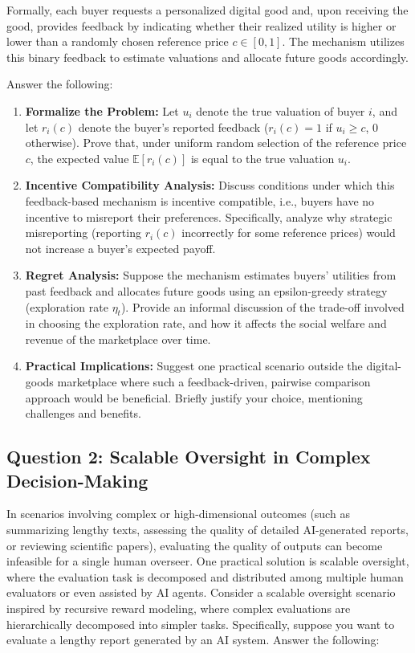 \documentclass[
  letterpaper,
  numbers=noenddot,
  DIV=11]{scrreprt}
\theoremstyle{plain}
\theoremstyle{definition}
\theoremstyle{remark}
\begin{document}
Formally, each buyer requests a personalized digital good and, upon
receiving the good, provides feedback by indicating whether their
realized utility is higher or lower than a randomly chosen reference
price \(c \in [0,1]\). The mechanism utilizes this binary feedback to
estimate valuations and allocate future goods accordingly.

Answer the following:

\begin{enumerate}
\def\labelenumi{(\alph{enumi})}
\item
  \textbf{Formalize the Problem:} Let \(u_i\) denote the true valuation
  of buyer \(i\), and let \(r_i(c)\) denote the buyer's reported
  feedback (\(r_i(c) = 1\) if \(u_i \geq c\), 0 otherwise). Prove that,
  under uniform random selection of the reference price \(c\), the
  expected value \(\mathbb{E}[r_i(c)]\) is equal to the true valuation
  \(u_i\).
\item
  \textbf{Incentive Compatibility Analysis:} Discuss conditions under
  which this feedback-based mechanism is incentive compatible, i.e.,
  buyers have no incentive to misreport their preferences. Specifically,
  analyze why strategic misreporting (reporting \(r_i(c)\) incorrectly
  for some reference prices) would not increase a buyer's expected
  payoff.
\item
  \textbf{Regret Analysis:} Suppose the mechanism estimates buyers'
  utilities from past feedback and allocates future goods using an
  epsilon-greedy strategy (exploration rate \(\eta_t\)). Provide an
  informal discussion of the trade-off involved in choosing the
  exploration rate, and how it affects the social welfare and revenue of
  the marketplace over time.
\item
  \textbf{Practical Implications:} Suggest one practical scenario
  outside the digital-goods marketplace where such a feedback-driven,
  pairwise comparison approach would be beneficial. Briefly justify your
  choice, mentioning challenges and benefits.
\end{enumerate}

\subsection{Question 2: Scalable Oversight in Complex
Decision-Making}\label{question-2-scalable-oversight-in-complex-decision-making}

In scenarios involving complex or high-dimensional outcomes (such as
summarizing lengthy texts, assessing the quality of detailed
AI-generated reports, or reviewing scientific papers), evaluating the
quality of outputs can become infeasible for a single human overseer.
One practical solution is scalable oversight, where the evaluation task
is decomposed and distributed among multiple human evaluators or even
assisted by AI agents. Consider a scalable oversight scenario inspired
by recursive reward modeling, where complex evaluations are
hierarchically decomposed into simpler tasks. Specifically, suppose you
want to evaluate a lengthy report generated by an AI system. Answer the
following:
\end{document}
